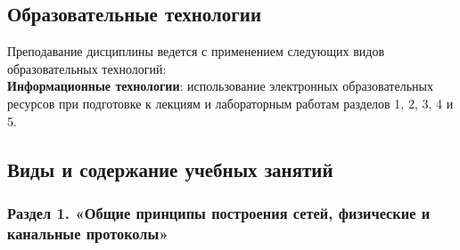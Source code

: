 \def\thesubsection{\Roman{subsection}}

\subsection{Образовательные технологии}

{\parindent0pt
Преподавание дисциплины ведется с применением следующих видов образовательных технологий:\\
\textbf{Информационные технологии}: использование электронных образовательных ресурсов при подготовке к лекциям и лабораторным работам разделов 1, 2, 3, 4 и 5.

}

\subsection{Виды и содержание учебных занятий}

\subsubsection{Раздел 1. «Общие принципы построения сетей, физические и канальные протоколы»}

